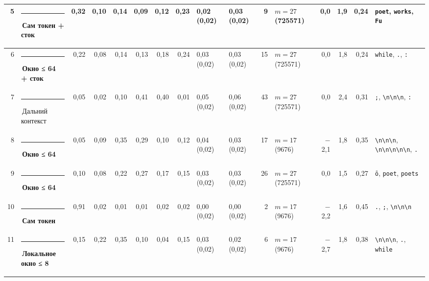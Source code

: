 \documentclass[10pt]{article}
\begin{document}
\begin{minipage}{\linewidth}
\begin{center}
{\begin{tabular}{|r|l|r|r|r|r|r|r|l|l|r|l|r|r|r|l|}
5 & \textcolor[HTML]{2A78D6}{\rule{0.62em}{0.62em}}\,\textbf{Сам токен + сток} & 0,32 & 0,10 & 0,14 & 0,09 & 0,12 & 0,23 & 0,02 (0,02) & 0,03 (0,02) & 9 & $m{=}27$ (725571) & 0,0 & 1,9 & 0,24 & \texttt{\textvisiblespace{}poet}, \texttt{\textvisiblespace{}works}, \texttt{\textvisiblespace{}Fu} \\ \hline
6 & \textcolor[HTML]{EDA100}{\rule{0.62em}{0.62em}}\,\textbf{Окно ≤ 64 + сток} & 0,22 & 0,08 & 0,14 & 0,13 & 0,18 & 0,24 & 0,03 (0,02) & 0,03 (0,02) & 15 & $m{=}27$ (725571) & 0,0 & 1,8 & 0,24 & \texttt{\textvisiblespace{}while}, \texttt{\textvisiblespace{}.}, \texttt{\textvisiblespace{}:} \\ \hline
7 & \textcolor[HTML]{C3C2B7}{\rule{0.62em}{0.62em}}\,Дальний контекст & 0,05 & 0,02 & 0,10 & 0,41 & 0,40 & 0,01 & 0,05 (0,02) & 0,06 (0,02) & 43 & $m{=}27$ (725571) & 0,0 & 2,4 & 0,31 & \texttt{\textvisiblespace{};}, \texttt{\textvisiblespace{}\textbackslash{}n\textbackslash{}n\textbackslash{}n}, \texttt{\textvisiblespace{}:} \\ \hline
8 & \textcolor[HTML]{EDA100}{\rule{0.62em}{0.62em}}\,\textbf{Окно ≤ 64} & 0,05 & 0,09 & 0,35 & 0,29 & 0,10 & 0,12 & 0,04 (0,02) & 0,03 (0,02) & 17 & $m{=}17$ (9676) & $-$2,1 & 1,8 & 0,35 & \texttt{\textvisiblespace{}\textbackslash{}n\textbackslash{}n\textbackslash{}n}, \texttt{\textbackslash{}n\textbackslash{}n\textbackslash{}n\textbackslash{}n\textbackslash{}n}, \texttt{\textvisiblespace{}.} \\ \hline
9 & \textcolor[HTML]{EDA100}{\rule{0.62em}{0.62em}}\,\textbf{Окно ≤ 64} & 0,10 & 0,08 & 0,22 & 0,27 & 0,17 & 0,15 & 0,03 (0,02) & 0,03 (0,02) & 26 & $m{=}27$ (725571) & 0,0 & 1,5 & 0,27 & \texttt{ō}, \texttt{\textvisiblespace{}poet}, \texttt{\textvisiblespace{}poets} \\ \hline
10 & \textcolor[HTML]{2A78D6}{\rule{0.62em}{0.62em}}\,\textbf{Сам токен} & 0,91 & 0,02 & 0,01 & 0,01 & 0,02 & 0,02 & 0,00 (0,02) & 0,00 (0,02) & 2 & $m{=}17$ (9676) & $-$2,2 & 1,6 & 0,45 & \texttt{\textvisiblespace{}.}, \texttt{\textvisiblespace{};}, \texttt{\textvisiblespace{}\textbackslash{}n\textbackslash{}n\textbackslash{}n} \\ \hline
11 & \textcolor[HTML]{1BAF7A}{\rule{0.62em}{0.62em}}\,\textbf{Локальное окно ≤ 8} & 0,15 & 0,22 & 0,35 & 0,10 & 0,04 & 0,15 & 0,03 (0,02) & 0,02 (0,02) & 6 & $m{=}17$ (9676) & $-$2,7 & 1,8 & 0,38 & \texttt{\textvisiblespace{}\textbackslash{}n\textbackslash{}n\textbackslash{}n}, \texttt{\textvisiblespace{}.}, \texttt{\textvisiblespace{}while} \\ \hline

\end{tabular}}
\end{center}
\end{minipage}
\end{document}
